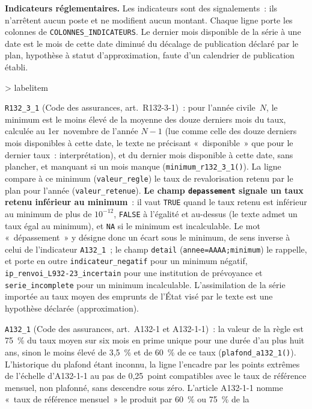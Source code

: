 \documentclass[a4paper,11pt]{article}
\makeatletter
\let\charte@listORI\list
\def\charte@listV{%
  \setlength{\topsep}{0.8ex plus 0.4ex minus 0.4ex}%
  \setlength{\partopsep}{0.4ex plus 0.2ex minus 0.2ex}%
  \charte@parskip=\parskip
  \addtolength{\topsep}{-\charte@parskip}%
  \addtolength{\partopsep}{\charte@parskip}%
  \setlength{\itemsep}{0.4ex plus 0.2ex minus 0.2ex}%
  \setlength{\parsep}{0.4ex plus 0.2ex minus 0.2ex}%
  \ifdim\charte@parskip>\z@
    \setlength{\parsep}{\charte@parskip}%
    \addtolength{\itemsep}{-\charte@parskip}%
  \fi}
\def\list#1#2{\charte@listORI{#1}{\charte@listV #2}}
\renewenvironment{itemize}[1][]{%
  \ifnum\@itemdepth>\thr@@\@toodeep\else
    \advance\@itemdepth\@ne
    \edef\@itemitem{labelitem\romannumeral\the\@itemdepth}%
    \expandafter\list\csname\@itemitem\endcsname
      {\def\makelabel##1{\hss\llap{##1}}\setkeys{charteliste}{#1}}%
  \fi}{\endlist}
\newcommand{\code}[1]{\texttt{\small #1}}
\makeatother
\begin{document}
\textbf{Indicateurs réglementaires.} Les indicateurs sont des
signalements~: ils n'arrêtent aucun poste et ne modifient aucun montant.
Chaque ligne porte les colonnes de \code{COLONNES\_INDICATEURS}. Le dernier
mois disponible de la série à une date est le mois de cette date diminué
du décalage de publication déclaré par le plan, hypothèse à statut
d'approximation, faute d'un calendrier de publication établi.

\begin{itemize}[itemsep=2pt]
\item \code{R132\_3\_1} (Code des assurances, art.~R132-3-1)~: pour
  l'année civile~$N$, le minimum est le moins élevé de la moyenne des douze
  derniers mois du taux, calculée au 1er~novembre de l'année $N-1$ (lue
  comme celle des douze derniers mois disponibles à cette date, le texte ne
  précisant «~disponible~» que pour le dernier taux~: interprétation), et du
  dernier mois disponible à cette date, sans plancher, et manquant si un mois
  manque (\code{minimum\_r132\_3\_1()}). La ligne compare à ce minimum
  (\code{valeur\_regle}) le taux de revalorisation retenu par le plan pour
  l'année (\code{valeur\_retenue}). \textbf{Le champ \code{depassement}
  signale un taux retenu inférieur au minimum}~: il vaut \code{TRUE} quand
  le taux retenu est inférieur au minimum de plus de $10^{-12}$,
  \code{FALSE} à l'égalité et au-dessus (le texte admet un taux égal au
  minimum), et \code{NA} si le minimum est incalculable. Le mot
  «~dépassement~» y désigne donc un écart sous le minimum, de sens inverse
  à celui de l'indicateur \code{A132\_1}~; le champ \code{detail}
  (\code{annee=AAAA;minimum}) le rappelle, et porte en outre
  \code{indicateur\_negatif} pour un minimum négatif,
  \code{ip\_renvoi\_L932-23\_incertain} pour une institution de prévoyance et
  \code{serie\_incomplete} pour un minimum incalculable. L'assimilation de
  la série importée au taux moyen des emprunts de l'État visé par le texte
  est une hypothèse déclarée (approximation).
\item \code{A132\_1} (Code des assurances, art.~A132-1 et A132-1-1)~: la
  valeur de la règle est 75~\% du taux moyen sur six mois en prime unique
  pour une durée d'au plus huit ans, sinon le moins élevé de 3,5~\% et de
  60~\% de ce taux (\code{plafond\_a132\_1()}). L'historique du plafond
  étant inconnu, la ligne l'encadre par les points extrêmes de l'échelle
  d'A132-1-1 au pas de 0,25~point compatibles avec le taux de référence
  mensuel, non plafonné, sans descendre sous zéro. L'article A132-1-1
  nomme «~taux de référence mensuel~» le produit par 60~\% ou 75~\% de la

\end{itemize}
\end{document}
